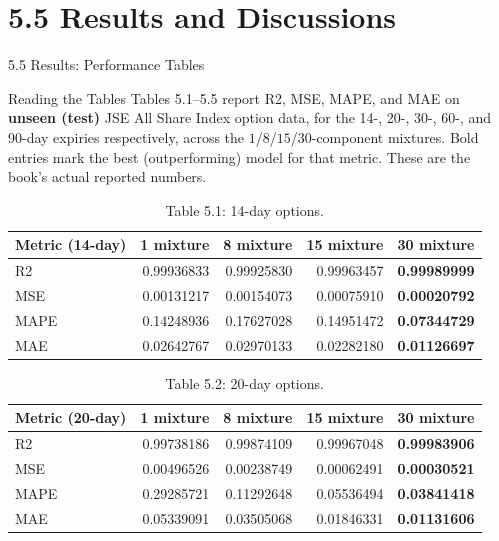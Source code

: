 \documentclass[aspectratio=169,10pt]{beamer}
\begin{document}
\section{5.5 Results and Discussions}
\begin{frame}[allowframebreaks]{5.5 Results: Performance Tables}

\begin{block}{Reading the Tables}
Tables 5.1--5.5 report R2, MSE, MAPE, and MAE on \textbf{unseen (test)}
JSE All Share Index option data, for the 14-, 20-, 30-, 60-, and 90-day
expiries respectively, across the $1$/$8$/$15$/$30$-component mixtures.
Bold entries mark the best (outperforming) model for that metric. These are
the book's actual reported numbers.
\end{block}

\begin{table}
\centering
\scriptsize
\begin{tabular}{lrrrr}
\toprule
Metric (14-day) & 1 mixture & 8 mixture & 15 mixture & 30 mixture \\
\midrule
R2   & 0.99936833 & 0.99925830 & 0.99963457 & \textbf{0.99989999} \\
MSE  & 0.00131217 & 0.00154073 & 0.00075910 & \textbf{0.00020792} \\
MAPE & 0.14248936 & 0.17627028 & 0.14951472 & \textbf{0.07344729} \\
MAE  & 0.02642767 & 0.02970133 & 0.02282180 & \textbf{0.01126697} \\
\bottomrule
\end{tabular}
\caption*{Table 5.1: 14-day options.}
\end{table}

\begin{table}
\centering
\scriptsize
\begin{tabular}{lrrrr}
\toprule
Metric (20-day) & 1 mixture & 8 mixture & 15 mixture & 30 mixture \\
\midrule
R2   & 0.99738186 & 0.99874109 & 0.99967048 & \textbf{0.99983906} \\
MSE  & 0.00496526 & 0.00238749 & 0.00062491 & \textbf{0.00030521} \\
MAPE & 0.29285721 & 0.11292648 & 0.05536494 & \textbf{0.03841418} \\
MAE  & 0.05339091 & 0.03505068 & 0.01846331 & \textbf{0.01131606} \\
\bottomrule
\end{tabular}
\caption*{Table 5.2: 20-day options.}
\end{table}


\end{frame}
\end{document}
